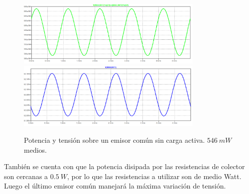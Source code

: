 \begin{figure}[H]
	\centering
	\includegraphics[width=0.8\textwidth]{ImagenesSimulaciones/PEC1.png}
		\includegraphics[width=0.8\textwidth]{ImagenesSimulaciones/VEC1.png}
	\caption{Potencia y tensión sobre un emisor común sin carga activa. $546 \ mW$ medios.}
	\label{fig:pec1}
\end{figure}

También se cuenta con que la potencia disipada por las resistencias de colector son cercanas a $0.5 \ W$, por lo que las resistencias a utilizar son de medio Watt. Luego el último emisor común manejará la máxima variación de tensión.

